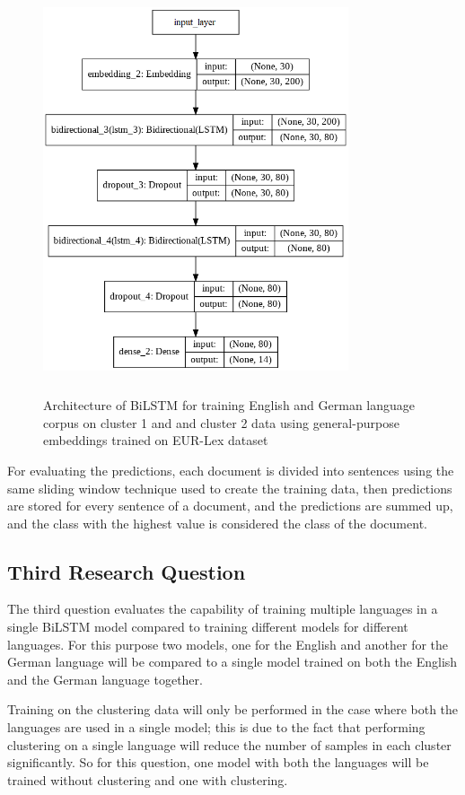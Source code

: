 \begin{figure}[!ht]
    \centering
    \includegraphics[width=9cm, height=12cm]{pics/LSTM_LEGALEMB_CLUSTER_1.png}
    \captionsetup{justification=centering,margin=1cm}
    \caption{Architecture of \gls{BiLSTM} for training English and German language corpus on cluster 1 and and cluster 2 data using general-purpose embeddings trained on EUR-Lex dataset}
    \label{fig:LegalEmbCluster}
\end{figure}

For evaluating the predictions, each document is divided into sentences using the same sliding window technique used to create the training data, then predictions are stored for every sentence of a document, and the predictions are summed up, and the class with the highest value is considered the class of the document. 

\subsection{Third Research Question}
The third question evaluates the capability of training multiple languages in a single \gls{BiLSTM} model compared to training different models for different languages. For this purpose two models, one for the English and another for the German language will be compared to a single model trained on both the English and the German language together.

Training on the clustering data will only be performed in the case where both the languages are used in a single model; this is due to the fact that performing clustering on a single language will reduce the number of samples in each cluster significantly. So for this question, one model with both the languages will be trained without clustering and one with clustering. 

